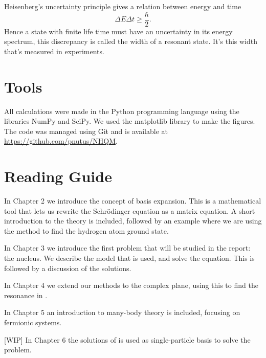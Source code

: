 
Heisenberg's uncertainty principle gives a relation between energy and time
\begin{equation}
\Delta E \Delta t \ge \frac{\hbar}{2}.
\end{equation}
Hence a state with finite life time must have an uncertainty in its energy spectrum, this discrepancy is called the width of a resonant state. It's this width that's measured in experiments.

\section{Tools}

All calculations were made in the Python programming language using the libraries NumPy and SciPy. We used the matplotlib library to make the figures. The code was managed using Git and is available at \url{https://github.com/pnutus/NHQM}.


\section{Reading Guide}
In Chapter 2 we introduce the concept of basis expansion. 
This is a mathematical tool that lets us rewrite the Schrödinger equation as a matrix equation.
A short introduction to the theory is included, followed by an example where we are using the method to find the hydrogen atom ground state.

In Chapter 3 we introduce the first problem that will be studied in the report: the  nucleus. We describe the model that is used, and solve the equation. 
This is followed by a discussion of the solutions.

In Chapter 4 we extend our methods to the complex plane, using this to find the resonance in .

In Chapter 5 an introduction to many-body theory is included, focusing on fermionic systems.  

[WIP] In Chapter 6 the solutions of  is used as single-particle basis to solve the  problem. 
